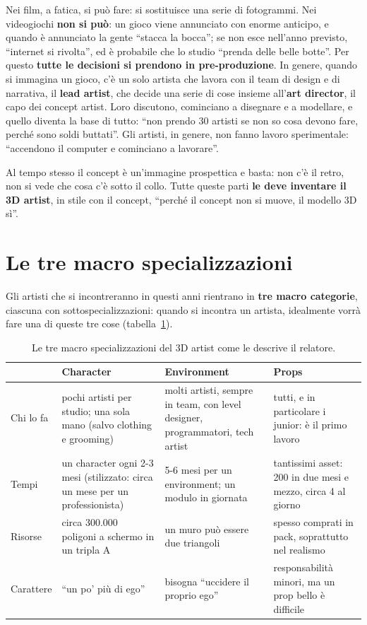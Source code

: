 Nei film, a fatica, si può fare: si sostituisce una serie di fotogrammi. Nei
videogiochi \textbf{non si può}: un gioco viene annunciato con enorme anticipo,
e quando è annunciato la gente ``stacca la bocca''; se non esce nell'anno
previsto, ``internet si rivolta'', ed è probabile che lo studio ``prenda delle
belle botte''. Per questo \textbf{tutte le decisioni si prendono in
pre-produzione}. In genere, quando si immagina un gioco, c'è un solo artista
che lavora con il team di design e di narrativa, il \textbf{lead artist}, che
decide una serie di cose insieme all'\textbf{art director}, il capo dei
concept artist. Loro discutono, cominciano a disegnare e a modellare, e quello
diventa la base di tutto: ``non prendo 30 artisti se non so cosa devono fare,
perché sono soldi buttati''. Gli artisti, in genere, non fanno lavoro
sperimentale: ``accendono il computer e cominciano a lavorare''.

Al tempo stesso il concept è un'immagine prospettica e basta: non c'è il retro,
non si vede che cosa c'è sotto il collo. Tutte queste parti \textbf{le deve
inventare il 3D artist}, in stile con il concept, ``perché il concept non si
muove, il modello 3D sì''.

\section{Le tre macro specializzazioni}
\label{p6:sec:specializzazioni}

Gli artisti che si incontreranno in questi anni rientrano in \textbf{tre macro
categorie}, ciascuna con sottospecializzazioni: quando si incontra un artista,
idealmente vorrà fare una di queste tre cose (tabella~\ref{p6:tab:macro}).

\begin{table}[htbp]
\centering
\small
\begin{tabular}{@{}lp{3.3cm}p{3.3cm}p{3.3cm}@{}}
\toprule
 & \textbf{Character} & \textbf{Environment} & \textbf{Props} \\
\midrule
Chi lo fa & pochi artisti per studio; una sola mano (salvo clothing e
grooming) & molti artisti, sempre in team, con level designer, programmatori,
tech artist & tutti, e in particolare i junior: è il primo lavoro \\
\addlinespace
Tempi & un character ogni 2-3 mesi (stilizzato: circa un mese per un
professionista) & 5-6 mesi per un environment; un modulo in giornata &
tantissimi asset: 200 in due mesi e mezzo, circa 4 al giorno \\
\addlinespace
Risorse & circa 300.000 poligoni a schermo in un tripla A & un muro può essere
due triangoli & spesso comprati in pack, soprattutto nel realismo \\
\addlinespace
Carattere & ``un po' più di ego'' & bisogna ``uccidere il proprio ego'' &
responsabilità minori, ma un prop bello è difficile \\
\bottomrule
\end{tabular}
\caption{Le tre macro specializzazioni del 3D artist come le descrive il
relatore.}
\label{p6:tab:macro}
\end{table}

